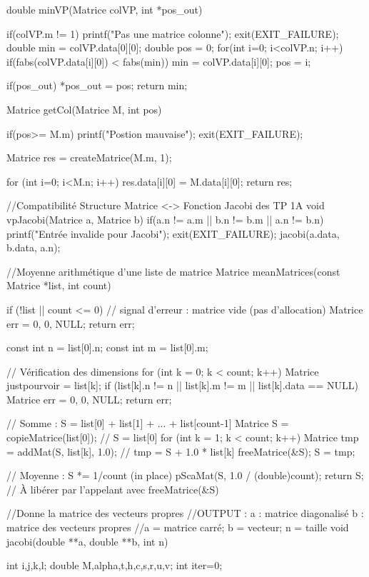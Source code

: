 \documentclass[12pt]{article}
\begin{document}
\begin{C}
double minVP(Matrice colVP, int *pos_out){
    if(colVP.m != 1){
        printf("Pas une matrice colonne");
        exit(EXIT_FAILURE);
    }
    double min = colVP.data[0][0];
    double pos = 0;
    for(int i=0; i<colVP.n; i++){
        if(fabs(colVP.data[i][0]) < fabs(min)) {
            min = colVP.data[i][0];
            pos = i;
        }
    }
    
    if(pos_out) *pos_out = pos;
    return min;
}

Matrice getCol(Matrice M, int pos){
    if(pos>= M.m){
        printf("Postion mauvaise");
        exit(EXIT_FAILURE);
    }
    
    Matrice res = createMatrice(M.m, 1);
    
    for (int i=0; i<M.n; i++) {
        res.data[i][0] = M.data[i][0];
    }
    return res;
}

//Compatibilité Structure Matrice <-> Fonction Jacobi des TP 1A
void vpJacobi(Matrice a, Matrice b)
{
    if(a.n != a.m || b.n != b.m || a.n != b.n)
    {
        printf("Entrée invalide pour Jacobi");
        exit(EXIT_FAILURE);
    }
    jacobi(a.data, b.data, a.n);
}

//Moyenne arithmétique d'une liste de matrice
Matrice meanMatrices(const Matrice *list, int count) {
    if (!list || count <= 0) {
        // signal d'erreur : matrice vide (pas d'allocation)
        Matrice err = {0, 0, NULL};
        return err;
    }

    const int n = list[0].n;
    const int m = list[0].m;

    // Vérification des dimensions
    for (int k = 0; k < count; k++) {
        Matrice justpourvoir = list[k];
        if (list[k].n != n || list[k].m != m || list[k].data == NULL) {
            Matrice err = {0, 0, NULL};
            return err;
        }
    }

    // Somme : S = list[0] + list[1] + ... + list[count-1]
    Matrice S = copieMatrice(list[0]);      // S = list[0]
    for (int k = 1; k < count; k++) {
        Matrice tmp = addMat(S, list[k], 1.0); // tmp = S + 1.0 * list[k]
        freeMatrice(&S);
        S = tmp;
    }

    // Moyenne : S *= 1/count (in place)
    pScaMat(S, 1.0 / (double)count);
    return S; // À libérer par l'appelant avec freeMatrice(&S)
}

//Donne la matrice des vecteurs propres
//OUTPUT : a : matrice diagonalisé b : matrice des vecteurs propres
//a = matrice carré; b = vecteur; n = taille
void jacobi(double **a, double **b, int n)
{
    int i,j,k,l;
    double M,alpha,t,h,c,s,r,u,v;
    int iter=0;
    
}
\end{C}
\end{document}
